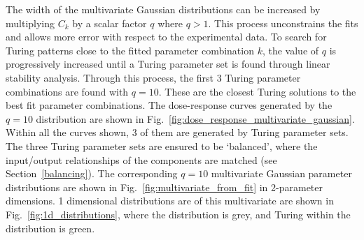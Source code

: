 The width of the multivariate Gaussian distributions can be increased by multiplying $C_k$ by a scalar factor $q$ where $q>1$.
This process unconstrains the fits and allows more error with respect to the experimental data.
To search for Turing patterns close to the fitted parameter combination $k$, the value of $q$ is progressively increased until a Turing parameter set is found through linear stability analysis.
Through this process, the first 3 Turing parameter combinations are found with $q=10$.
These are the closest Turing solutions to the best fit parameter combinations.
The dose-response curves generated by the $q=10$ distribution are shown in Fig.~\ref{fig:dose_response_multivariate_gaussian}.
Within all the curves shown, 3 of them are generated by Turing parameter sets.
The three Turing parameter sets are ensured to be ‘balanced’, where the input/output relationships of the components are matched (see Section~\ref{balancing}).
The corresponding $q=10$ multivariate Gaussian parameter distributions are shown in Fig.~\ref{fig:multivariate_from_fit} in 2-parameter dimensions.
1 dimensional distributions are of this multivariate are shown in Fig.~\ref{fig:1d_distributions}, where the distribution is grey, and Turing within the distribution is green.

